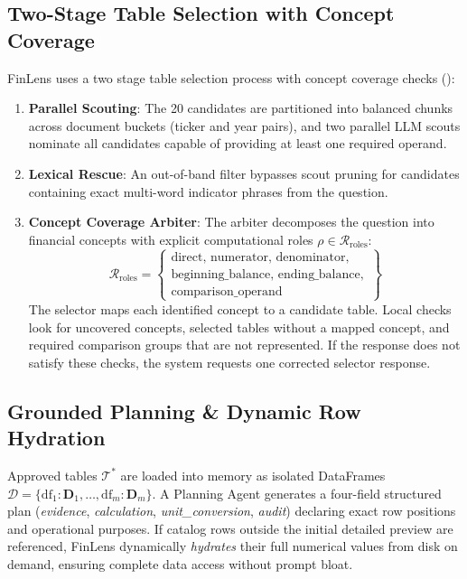 \documentclass[10pt,journal,compsoc]{IEEEtran}
\begin{document}
\subsection{Two-Stage Table Selection with Concept Coverage}
FinLens uses a two stage table selection process with concept coverage checks ():
\begin{enumerate}
    \item \textbf{Parallel Scouting}: The 20 candidates are partitioned into balanced chunks across document buckets (ticker and year pairs), and two parallel LLM scouts nominate all candidates capable of providing at least one required operand.
    \item \textbf{Lexical Rescue}: An out-of-band filter bypasses scout pruning for candidates containing exact multi-word indicator phrases from the question.
    \item \textbf{Concept Coverage Arbiter}: The arbiter decomposes the question into financial concepts with explicit computational roles $\rho \in \mathcal{R}_{\text{roles}}$:
    \begin{equation}
        \mathcal{R}_{\text{roles}} = \left\{
        \begin{array}{l}
            \text{direct}, \, \text{numerator}, \, \text{denominator}, \\
            \text{beginning\_balance}, \, \text{ending\_balance}, \\
            \text{comparison\_operand}
        \end{array}
        \right\}
    \end{equation}
    The selector maps each identified concept to a candidate table. Local checks look for uncovered concepts, selected tables without a mapped concept, and required comparison groups that are not represented. If the response does not satisfy these checks, the system requests one corrected selector response.
\end{enumerate}

\subsection{Grounded Planning \& Dynamic Row Hydration}
Approved tables $\mathcal{T}^*$ are loaded into memory as isolated DataFrames $\mathcal{D} = \{ \text{df}_1: \mathbf{D}_1, \dots, \text{df}_m: \mathbf{D}_m \}$. A Planning Agent generates a four-field structured plan (\textit{evidence}, \textit{calculation}, \textit{unit\_conversion}, \textit{audit}) declaring exact row positions and operational purposes. If catalog rows outside the initial detailed preview are referenced, FinLens dynamically \textit{hydrates} their full numerical values from disk on demand, ensuring complete data access without prompt bloat.
\end{document}
